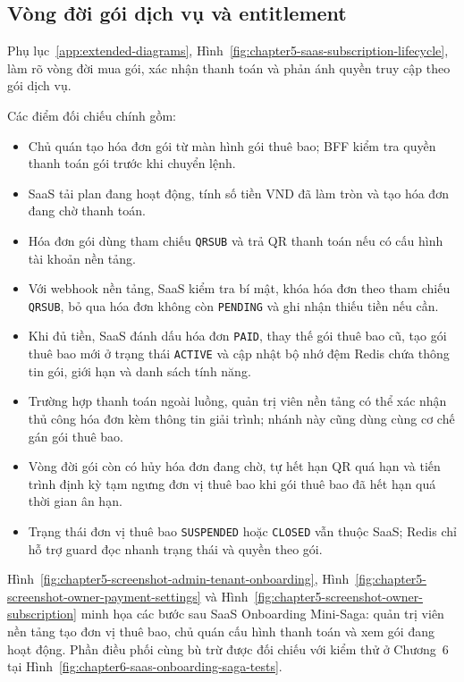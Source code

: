 \subsection{Vòng đời gói dịch vụ và entitlement}

Phụ lục~\ref{app:extended-diagrams}, Hình~\ref{fig:chapter5-saas-subscription-lifecycle}, làm rõ vòng đời mua gói, xác nhận thanh toán và phản ánh quyền truy cập theo gói dịch vụ.

Các điểm đối chiếu chính gồm:

\begin{itemize}
  \item Chủ quán tạo hóa đơn gói từ màn hình gói thuê bao; BFF kiểm tra quyền thanh toán gói trước khi chuyển lệnh.
  \item SaaS tải plan đang hoạt động, tính số tiền VND đã làm tròn và tạo hóa đơn đang chờ thanh toán.
  \item Hóa đơn gói dùng tham chiếu \texttt{QRSUB} và trả QR thanh toán nếu có cấu hình tài khoản nền tảng.
  \item Với webhook nền tảng, SaaS kiểm tra bí mật, khóa hóa đơn theo tham chiếu \texttt{QRSUB}, bỏ qua hóa đơn không còn \texttt{PENDING} và ghi nhận thiếu tiền nếu cần.
  \item Khi đủ tiền, SaaS đánh dấu hóa đơn \texttt{PAID}, thay thế gói thuê bao cũ, tạo gói thuê bao mới ở trạng thái \texttt{ACTIVE} và cập nhật bộ nhớ đệm Redis chứa thông tin gói, giới hạn và danh sách tính năng.
  \item Trường hợp thanh toán ngoài luồng, quản trị viên nền tảng có thể xác nhận thủ công hóa đơn kèm thông tin giải trình; nhánh này cũng dùng cùng cơ chế gán gói thuê bao.
  \item Vòng đời gói còn có hủy hóa đơn đang chờ, tự hết hạn QR quá hạn và tiến trình định kỳ tạm ngưng đơn vị thuê bao khi gói thuê bao đã hết hạn quá thời gian ân hạn.
  \item Trạng thái đơn vị thuê bao \texttt{SUSPENDED} hoặc \texttt{CLOSED} vẫn thuộc SaaS; Redis chỉ hỗ trợ guard đọc nhanh trạng thái và quyền theo gói.
\end{itemize}

Hình~\ref{fig:chapter5-screenshot-admin-tenant-onboarding}, Hình~\ref{fig:chapter5-screenshot-owner-payment-settings} và Hình~\ref{fig:chapter5-screenshot-owner-subscription} minh họa các bước sau SaaS Onboarding Mini-Saga: quản trị viên nền tảng tạo đơn vị thuê bao, chủ quán cấu hình thanh toán và xem gói đang hoạt động. Phần điều phối cùng bù trừ được đối chiếu với kiểm thử ở Chương~6 tại Hình~\ref{fig:chapter6-saas-onboarding-saga-tests}.

